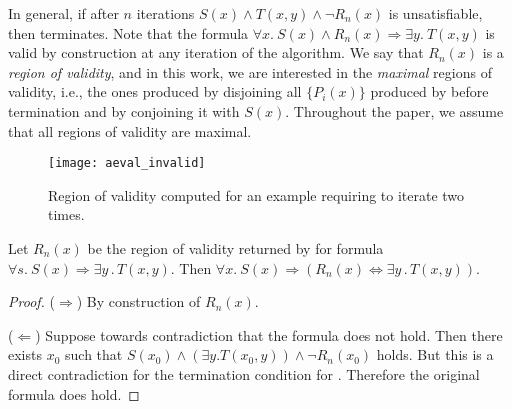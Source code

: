 In general, if after $n$ iterations $S(x) \land T(x,y) \land \neg R_n(x)$ is unsatisfiable,
then \aeval terminates.
Note that the formula $\forall x.~ S(x) \land R_n(x) \Rightarrow \exists y .~T(x,y)$ is valid by construction at any iteration of the algorithm.
%
We say that $R_n(x)$ is a \emph{region of validity}, and in this work, we are interested in the \emph{maximal} regions of validity, i.e., the ones produced by disjoining all $\{P_i(x)\}$ produced by \aeval before termination and by conjoining it with $S(x)$.
Throughout the paper, we assume that all regions of validity are maximal.



\begin{figure}[!t]
\centering
\texttt{[image: aeval\_invalid]}
\caption{Region of validity computed for an example requiring \aeval to iterate two times.}
\label{fg:aeval}
\end{figure}

\begin{lemma}\label{lem:aeval}
  Let $R_n(x)$ be the region of validity returned by \aeval for  formula $\forall
  s.~ S(x) \Rightarrow \exists y\,.\,T(x,y)$. Then
$  \forall x.~ S(x) \Rightarrow (R_n(x) \Leftrightarrow \exists y\,.\,T(x,y))$.
\end{lemma}
\begin{proof}
  ($\Rightarrow$) By construction of $R_n(x)$.

  ($\Leftarrow$) Suppose towards contradiction that the formula does
  not hold. Then there exists $x_0$ such that $S(x_0) \land (\exists
  y. T(x_0, y)) \land \neg R_n(x_0)$ holds. But this is a direct
  contradiction for the termination condition for \aeval. Therefore
  the original formula does hold.
\end{proof}

